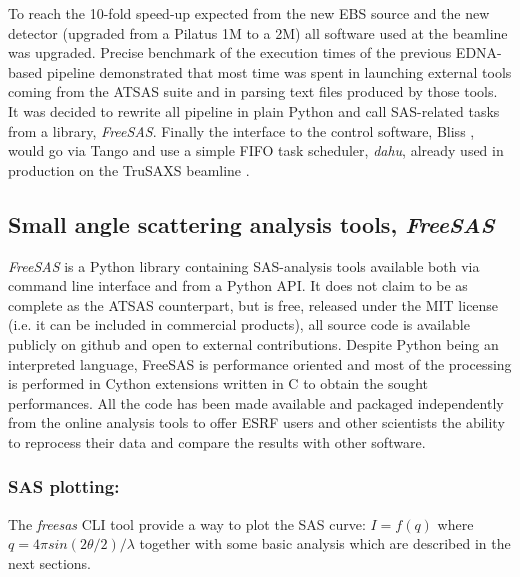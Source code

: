 \documentclass[preprint]{iucr}              %
\begin{document}
To reach the 10-fold speed-up expected from the new EBS source and the new detector (upgraded from a Pilatus 1M to a 2M) all software used at the beamline was upgraded.
Precise benchmark of the execution times of the previous EDNA-based pipeline demonstrated that 
most time was spent in launching external tools coming from the ATSAS suite and in parsing text files produced by those tools.
It was decided to rewrite all pipeline in plain Python \cite{python} and call SAS-related tasks from a library, \textit{FreeSAS}. 
Finally the interface to the control software, Bliss \cite{bliss}, would go via Tango \cite{tango} and use a simple FIFO task scheduler,  \textit{dahu}, already used in production on the TruSAXS beamline \cite{id02_2022}.   

\subsection{Small angle scattering analysis tools, \textit{FreeSAS}}

\textit{FreeSAS} is a Python \cite{python} library containing SAS-analysis tools available both via command line interface and from a Python API. 
It does not claim to be as complete as the ATSAS counterpart,
but is free, released under the MIT license (i.e. it can be included in commercial products), all source code is available publicly on github \cite{freesas} and
open to external contributions.
Despite Python being an interpreted language, FreeSAS is performance oriented and most of the processing is performed in Cython \cite{cython} extensions written in C to obtain the sought performances. 
All the code has been made available and packaged independently from the online analysis tools to offer ESRF users and other scientists the ability to reprocess their data and compare the results with other software.

\subsubsection{SAS plotting:} The \textit{freesas} CLI tool provide a way to plot the SAS curve: $I=f(q)$ where $q = 4\pi sin(2\theta/2)/\lambda$ together with some basic analysis which are described in the next sections.
\end{document}
